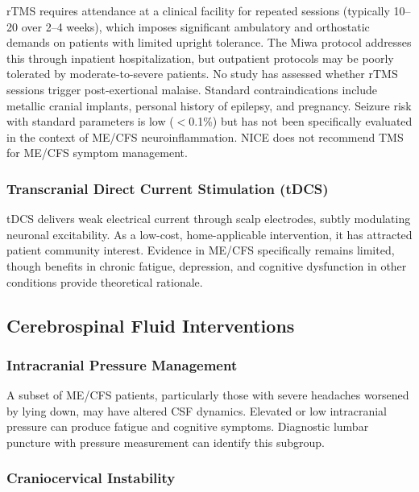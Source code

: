 \begin{warning}
rTMS requires attendance at a clinical facility for repeated sessions (typically 10--20 over 2--4 weeks), which imposes significant ambulatory and orthostatic demands on patients with limited upright tolerance. The Miwa protocol addresses this through inpatient hospitalization, but outpatient protocols may be poorly tolerated by moderate-to-severe patients. No study has assessed whether rTMS sessions trigger post-exertional malaise. Standard contraindications include metallic cranial implants, personal history of epilepsy, and pregnancy. Seizure risk with standard parameters is low ($<$0.1\%) but has not been specifically evaluated in the context of ME/CFS neuroinflammation. NICE does not recommend TMS for ME/CFS symptom management.
\end{warning}

\subsubsection{Transcranial Direct Current Stimulation (tDCS)}

tDCS delivers weak electrical current through scalp electrodes, subtly modulating neuronal excitability. As a low-cost, home-applicable intervention, it has attracted patient community interest. Evidence in ME/CFS specifically remains limited, though benefits in chronic fatigue, depression, and cognitive dysfunction in other conditions provide theoretical rationale.

\subsection{Cerebrospinal Fluid Interventions}

\subsubsection{Intracranial Pressure Management}

A subset of ME/CFS patients, particularly those with severe headaches worsened by lying down, may have altered CSF dynamics. Elevated or low intracranial pressure can produce fatigue and cognitive symptoms. Diagnostic lumbar puncture with pressure measurement can identify this subgroup.

\subsubsection{Craniocervical Instability}

